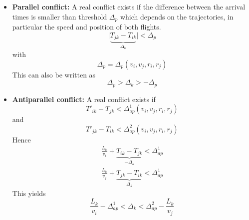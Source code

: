 \documentclass{article}
\begin{document}
\begin{itemize}
    \item {\bf Parallel conflict:}
        A real conflict exists if the difference between the arrival times is smaller than threshold $\Delta_p$ which depends on the trajectories, in particular the speed and position of both flights.
        \begin{equation*}
            \bigl| \underbrace{T_{jk} - T_{ik}}_{\Delta_k} \bigr| < \Delta_p
        \end{equation*}
        with
        \begin{equation*}
            \Delta_p = \Delta_p(v_i, v_j, r_i, r_j)
        \end{equation*}
        This can also be written as
        \begin{equation}  \label{eqn:spatial_conflict_parallel}
            \Delta_p > \Delta_k > -\Delta_p 
        \end{equation}
        
    \item {\bf Antiparallel conflict:}
        A real conflict exists if 
        \begin{equation*}
            T'_{ik} - T_{jk} < \Delta^1_{ap}(v_i, v_j, r_i, r_j)
        \end{equation*}
        and
        \begin{equation*}
            T'_{jk} - T_{ik} < \Delta^2_{ap}(v_i, v_j, r_i, r_j)
        \end{equation*}
        Hence
        \begin{eqnarray*}
            \frac{L_k}{v_i} + \underbrace{T_{ik} - T_{jk}}_{-\Delta_k} < \Delta^1_{ap} \\
            \frac{L_k}{v_j} + \underbrace{T_{jk} - T_{ik}}_{\Delta_k} < \Delta^1_{ap} 
        \end{eqnarray*}
        This yields
        \begin{equation} \label{eqn:spatial_conflict_antiparallel}
            \frac{L_k}{v_i} - \Delta^1_{ap} < \Delta_k < \Delta^2_{ap} - \frac{L_k}{v_j}
        \end{equation}
\end{itemize}
\end{document}
